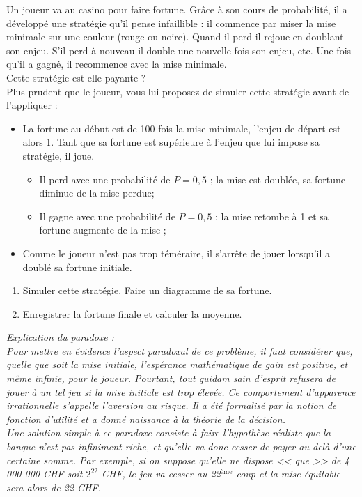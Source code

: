 \documentclass[a4paper,12pt]{article}
\begin{document}
Un joueur va au casino pour faire fortune. Grâce à son cours de probabilité, il a développé une stratégie qu'il pense infaillible : il commence par miser la mise minimale sur une couleur (rouge ou noire). Quand il perd il rejoue en doublant son enjeu. S'il perd  à nouveau il double une nouvelle fois son enjeu, etc. Une fois qu'il a gagné, il recommence avec la mise minimale.\\ Cette stratégie est-elle payante ? \\
Plus prudent que le joueur, vous lui proposez de simuler cette stratégie avant de l'appliquer :

\begin{itemize}
\item La fortune au début est de 100 fois la mise minimale, l'enjeu de
départ est alors 1. Tant que sa fortune est supérieure à l'enjeu que lui impose sa
stratégie, il joue.
	\begin{itemize}
	  \item Il perd avec une probabilité de $P=0,5$ ; la mise est doublée, sa fortune diminue de la mise perdue;
	  \item Il gagne avec une probabilité de $P=0,5$ : la mise retombe à 1 et sa fortune  augmente de la mise ;
	\end{itemize}
	\item Comme le joueur n'est pas trop téméraire, il s'arrête de jouer lorsqu'il a
doublé sa fortune initiale.
      \end{itemize}
      \begin{enumerate}
	\item Simuler cette stratégie. Faire un diagramme de sa fortune.
	\item Enregistrer la fortune finale et calculer la moyenne.
      \end{enumerate}

\textit{ Explication du paradoxe :\\
Pour mettre en évidence l'aspect paradoxal de ce problème, il faut considérer que, quelle que soit la mise initiale, l'espérance mathématique de gain est positive, et même infinie, pour le joueur. Pourtant, tout quidam sain d'esprit refusera de jouer à un tel jeu si la mise initiale est trop élevée. Ce comportement d'apparence irrationnelle s'appelle l'aversion au risque. Il a été formalisé par la notion de fonction d'utilité et a donné naissance à la théorie de la décision.\\
Une solution simple à ce paradoxe consiste à faire l'hypothèse réaliste que la banque n'est pas infiniment riche, et qu'elle va donc cesser de payer au-delà d'une certaine somme. Par exemple, si on suppose qu'elle ne dispose << que >> de 4 000 000 CHF soit
$2^{22}$ CHF, le jeu va cesser au 22$^{\mathrm{ème}}$ coup et la mise équitable sera alors de 22 CHF.}
\end{document}
